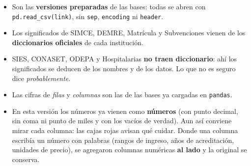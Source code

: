 \documentclass[10.5pt]{article}
\begin{document}
\begin{alertabox}[Importante]
\begin{itemize}[leftmargin=1.1em,itemsep=2pt,topsep=2pt]
\item Son las \textbf{versiones preparadas} de las bases: todas se abren con \texttt{pd.read\_\allowbreak{}csv(link)}, sin \texttt{sep}, \texttt{encoding} ni \texttt{header}.
\item Los significados de SIMCE, DEMRE, Matrícula y Subvenciones vienen de los \textbf{diccionarios oficiales} de cada institución.
\item SIES, CONASET, ODEPA y Hospitalarias \textbf{no traen diccionario}: ahí los significados se deducen de los nombres y de los datos. Lo que no es seguro dice \emph{probablemente}.
\item Las cifras de \emph{filas} y \emph{columnas} son las de las bases ya cargadas en \texttt{pandas}.
\item En esta versión los números ya vienen como \textbf{números} (con punto decimal, sin coma ni punto de miles y con los vacíos de verdad). Aun así conviene mirar cada columna: las cajas rojas avisan qué cuidar. Donde una columna escribía un número con palabras (rangos de ingreso, años de acreditación, unidades de precio), se agregaron columnas numéricas \textbf{al lado} y la original se conserva.
\end{itemize}
\end{alertabox}

\newpage
{}\label{base1}\hypertarget{base1}{}
\end{document}
